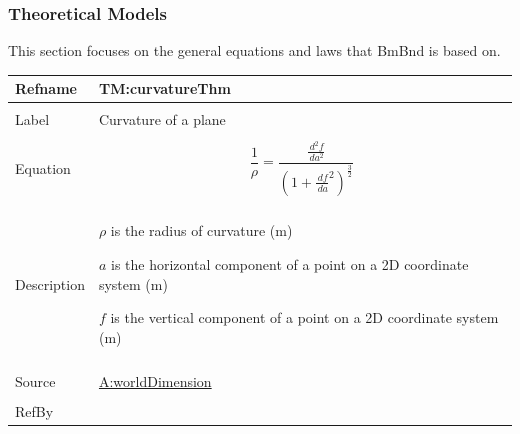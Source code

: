 \documentclass[12pt]{article}
\begin{document}
\subsubsection{Theoretical Models}
\label{Sec:TMs}
This section focuses on the general equations and laws that BmBnd is based on.

\vspace{\baselineskip}
\noindent
\begin{minipage}{\textwidth}
\begin{tabular}{>{\raggedright}p{}>{\raggedright\arraybackslash}p{}}
\toprule \textbf{Refname} & \textbf{TM:curvatureThm}
\label{TM:curvatureThm}
\\ \midrule \\
Label & Curvature of a plane
        
\\ \midrule \\
Equation & \begin{displaymath}
           \frac{1}{ρ}=\frac{\frac{\,d^{2}f}{\,da^{2}}}{\left(1+\frac{\,df}{\,da}^{2}\right)^{\frac{3}{2}}}
           \end{displaymath}
\\ \midrule \\
Description & \begin{symbDescription}
              \item{$ρ$ is the radius of curvature (${\text{m}}$)}
              \item{$a$ is the horizontal component of a point on a 2D coordinate system (${\text{m}}$)}
              \item{$f$ is the vertical component of a point on a 2D coordinate system (${\text{m}}$)}
              \end{symbDescription}
\\ \midrule \\
Source & \hyperref[worldDimension]{A:worldDimension}
         
\\ \midrule \\
RefBy & 
\\ \bottomrule
\end{tabular}
\end{minipage}
\vspace{\baselineskip}
\noindent
\end{document}
